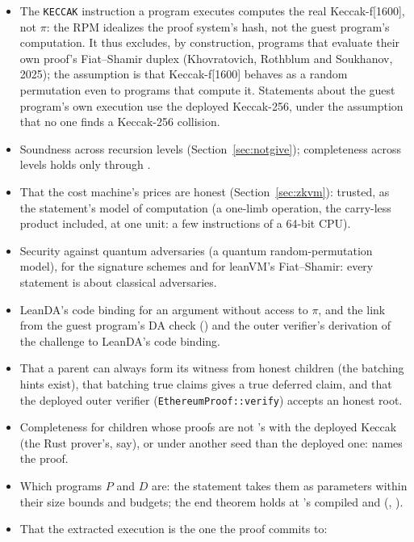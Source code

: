 \documentclass[11pt]{article}
\begin{document}
\begin{itemize}
\item The \texttt{KECCAK} instruction a program executes computes the real Keccak-f[1600], not
$\pi$: the RPM idealizes the proof system's hash, not the guest program's computation. It thus
excludes, by construction, programs that evaluate their own proof's Fiat--Shamir duplex
(Khovratovich, Rothblum and Soukhanov, 2025); the assumption is that Keccak-f[1600] behaves as a
random permutation even to programs that compute it. Statements
about the guest program's own execution use the deployed Keccak-256, under the assumption that no
one finds a Keccak-256 collision.
\item Soundness across recursion levels (Section~\ref{sec:notgive}); completeness across levels
holds only through .
\item That the cost machine's prices are honest (Section~\ref{sec:zkvm}): trusted, as the
statement's model of computation (a one-limb operation, the carry-less product included, at one
unit: a few instructions of a 64-bit CPU).
\item Security against quantum adversaries (a quantum random-permutation model), for the
signature schemes and for leanVM's Fiat--Shamir: every statement is about classical adversaries.
\item LeanDA's code binding for an argument without access to $\pi$, and the link from the guest
program's DA check () and the outer verifier's derivation of the challenge to
LeanDA's code binding.
\item That a parent can always form its witness from honest children (the batching hints exist),
that batching true claims gives a true deferred claim, and that the deployed outer verifier
(\texttt{EthereumProof::verify}) accepts an honest root.
\item Completeness for children whose proofs are not 's with the
deployed Keccak (the Rust prover's, say), or under another seed than the deployed one:
 names the proof.
\item Which programs $P$ and $D$ are: the statement takes them as parameters within their size
bounds and budgets; the end theorem holds at 's compiled 
and  (,
).
\item That the extracted execution is the one the proof commits to: 

\end{itemize}
\end{document}
